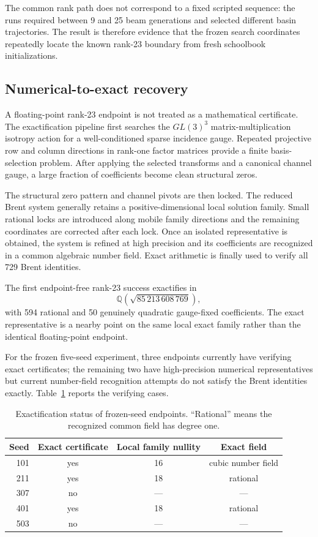 \documentclass[11pt]{article}
\newcommand{\QQ}{\mathbb{Q}}
\begin{document}
The common rank path does not correspond to a fixed scripted sequence: the runs required between 9 and 25 beam generations and selected different basin trajectories.  The result is therefore evidence that the frozen search coordinates repeatedly locate the known rank-23 boundary from fresh schoolbook initializations.

\subsection{Numerical-to-exact recovery}

A floating-point rank-23 endpoint is not treated as a mathematical certificate.  The exactification pipeline first searches the $GL(3)^3$ matrix-multiplication isotropy action for a well-conditioned sparse incidence gauge.  Repeated projective row and column directions in rank-one factor matrices provide a finite basis-selection problem.  After applying the selected transforms and a canonical channel gauge, a large fraction of coefficients become clean structural zeros.

The structural zero pattern and channel pivots are then locked.  The reduced Brent system generally retains a positive-dimensional local solution family.  Small rational locks are introduced along mobile family directions and the remaining coordinates are corrected after each lock.  Once an isolated representative is obtained, the system is refined at high precision and its coefficients are recognized in a common algebraic number field.  Exact arithmetic is finally used to verify all 729 Brent identities.

The first endpoint-free rank-23 success exactifies in
\begin{equation}
\QQ\!\left(\sqrt{85\,213\,608\,769}\right),
\end{equation}
with 594 rational and 50 genuinely quadratic gauge-fixed coefficients.  The exact representative is a nearby point on the same local exact family rather than the identical floating-point endpoint.

For the frozen five-seed experiment, three endpoints currently have verifying exact certificates; the remaining two have high-precision numerical representatives but current number-field recognition attempts do not satisfy the Brent identities exactly.  Table~\ref{tab:exact} reports the verifying cases.

\begin{table}[ht]
\centering
\caption{Exactification status of frozen-seed endpoints.  ``Rational'' means the recognized common field has degree one.}
\label{tab:exact}
\begin{tabular}{rccc}
\toprule
Seed & Exact certificate & Local family nullity & Exact field \\
\midrule
101 & yes & 16 & cubic number field \\
211 & yes & 18 & rational \\
307 & no  & --- & --- \\
401 & yes & 18 & rational \\
503 & no  & --- & --- \\
\bottomrule
\end{tabular}
\end{table}
\end{document}
